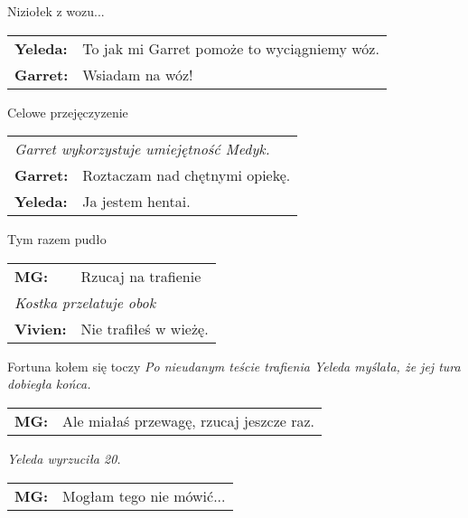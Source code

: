 \documentclass[10pt,twoside,twocolumn]{book}
\begin{document}
\begin{rpg-quotebox}{Niziołek z wozu...}
   \begin{tabularx}{\columnwidth}{lX}
      \textbf{Yeleda:} & To jak mi Garret pomoże to wyciągniemy wóz.\\
      \textbf{Garret:} & Wsiadam na wóz!\\
   \end{tabularx}
\end{rpg-quotebox}


\begin{rpg-quotebox}{Celowe przejęczyzenie}
   \begin{tabularx}{\columnwidth}{lX}
      \multicolumn{2}{l}{\textit{Garret wykorzystuje umiejętność Medyk.}}\\
      \textbf{Garret:} & Roztaczam nad chętnymi opiekę.\\
      \textbf{Yeleda:} & Ja jestem hentai.
   \end{tabularx}
\end{rpg-quotebox}

\begin{rpg-quotebox}{Tym razem pudło}
   \begin{tabularx}{\columnwidth}{lX}
      \textbf{MG:} & Rzucaj na trafienie\\
      \multicolumn{2}{l}{\textit{Kostka przelatuje obok}} \\
      \textbf{Vivien:} & Nie trafiłeś w wieżę.\\
   \end{tabularx}
\end{rpg-quotebox}

\begin{rpg-quotebox}{Fortuna kołem się toczy}
   \textit{Po nieudanym teście trafienia Yeleda myślała, że jej tura dobiegła końca.}\\

   \vskip-0.05cm
   \begin{tabularx}{\columnwidth}{lX}
      \textbf{MG:} & Ale miałaś przewagę, rzucaj jeszcze raz.\\
   \end{tabularx}

   \vskip0.15cm
   \textit{Yeleda wyrzuciła 20.}\\

   \vskip-0.05cm
   \begin{tabularx}{\columnwidth}{lX}
      \textbf{MG:} & Mogłam tego nie mówić...\\
   \end{tabularx}
\end{rpg-quotebox}
\end{document}
